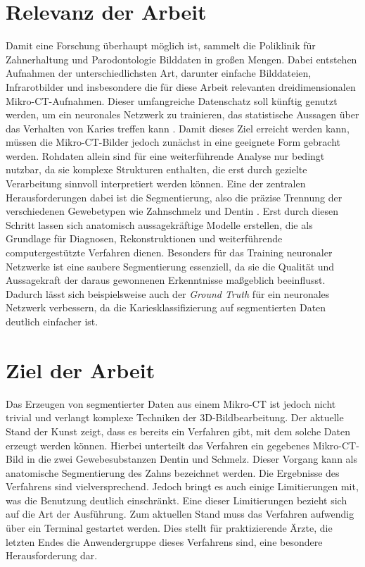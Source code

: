 \section{Relevanz der Arbeit}
\label{sec:relevanz_der_arbeit} Damit eine Forschung überhaupt möglich ist, sammelt
die Poliklinik für Zahnerhaltung und Parodontologie Bilddaten in großen Mengen.
Dabei entstehen Aufnahmen der unterschiedlichsten Art, darunter einfache Bilddateien,
Infrarotbilder und insbesondere die für diese Arbeit relevanten
dreidimensionalen Mikro-\ac{CT}-Aufnahmen. Dieser umfangreiche Datenschatz soll
künftig genutzt werden, um ein neuronales Netzwerk zu trainieren, das
statistische Aussagen über das Verhalten von Karies treffen kann \citep[vgl.][S.~1]{walter2025projekt}.
Damit dieses Ziel erreicht werden kann, müssen die Mikro-\ac{CT}-Bilder jedoch
zunächst in eine geeignete Form gebracht werden. Rohdaten allein sind für eine weiterführende
Analyse nur bedingt nutzbar, da sie komplexe Strukturen enthalten, die erst durch
gezielte Verarbeitung sinnvoll interpretiert werden können. Eine der zentralen
Herausforderungen dabei ist die Segmentierung, also die präzise Trennung der verschiedenen
Gewebetypen wie Zahnschmelz und Dentin \citep[vgl.][S.~359]{lehmann2013bildverarbeitung}.
Erst durch diesen Schritt lassen sich anatomisch aussagekräftige Modelle erstellen,
die als Grundlage für Diagnosen, Rekonstruktionen und weiterführende computergestützte
Verfahren dienen. Besonders für das Training neuronaler Netzwerke ist eine
saubere Segmentierung essenziell, da sie die Qualität und Aussagekraft der daraus
gewonnenen Erkenntnisse maßgeblich beeinflusst. Dadurch lässt sich
beispielsweise auch der \textit{Ground Truth} für ein neuronales Netzwerk verbessern,
da die Kariesklassifizierung auf segmentierten Daten deutlich einfacher ist.

\section{Ziel der Arbeit}
\label{sec:ziel_der_arbeit} Das Erzeugen von segmentierter Daten aus einem Mikro-\ac{CT}
ist jedoch nicht trivial und verlangt komplexe Techniken der 3D-Bildbearbeitung.
Der aktuelle Stand der Kunst zeigt, dass es bereits ein Verfahren gibt, mit dem
solche Daten erzeugt werden können. Hierbei unterteilt das Verfahren ein gegebenes
Mikro-\ac{CT}-Bild in die zwei Gewebesubstanzen Dentin und Schmelz. Dieser Vorgang
kann als anatomische Segmentierung des Zahns bezeichnet werden. Die Ergebnisse
des Verfahrens sind vielversprechend. Jedoch bringt es auch einige Limitierungen
mit, was die Benutzung deutlich einschränkt. Eine dieser Limitierungen bezieht sich
auf die Art der Ausführung. Zum aktuellen Stand muss das Verfahren aufwendig
über ein Terminal gestartet werden. Dies stellt für praktizierende Ärzte, die
letzten Endes die Anwendergruppe dieses Verfahrens sind, eine besondere Herausforderung
dar.

